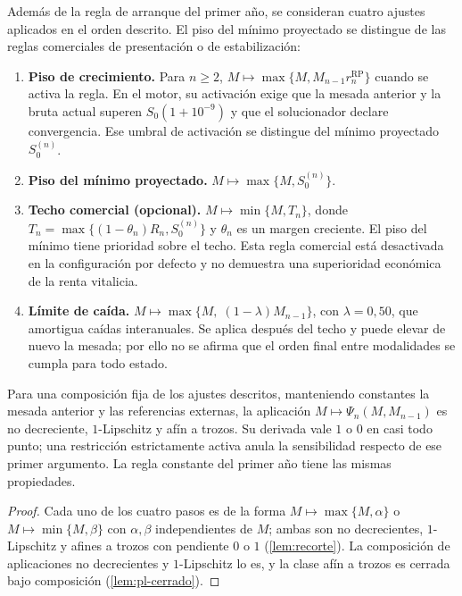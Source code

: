 Además de la regla de arranque del primer año, se consideran cuatro ajustes
aplicados en el orden descrito. El piso del mínimo proyectado se distingue de las reglas
comerciales de presentación o de estabilización:

\begin{enumerate}[leftmargin=*]
  \item \textbf{Piso de crecimiento.}
        Para $n\ge2$, $M\mapsto\max\{M,M_{n-1}r_n^{\mathrm{RP}}\}$ cuando
        se activa la regla. En el motor, su activación exige que la mesada
        anterior y la bruta actual superen $S_0(1+10^{-9})$ y que el
        solucionador declare convergencia. Ese umbral de activación se
        distingue del mínimo proyectado $S_0^{(n)}$.
  \item \textbf{Piso del mínimo proyectado.}
        $M\mapsto\max\{M,S_0^{(n)}\}$.
  \item \textbf{Techo comercial (opcional).}
        $M\mapsto\min\{M,T_n\}$, donde
        $T_n=\max\{(1-\theta_n)R_n,S_0^{(n)}\}$ y $\theta_n$ es un margen
        creciente. El piso del mínimo tiene prioridad sobre el techo. Esta regla
        comercial está desactivada en la configuración por defecto y no
        demuestra una superioridad económica de la renta vitalicia.
  \item \textbf{Límite de caída.} $M\mapsto\max\{M,\;(1-\lambda)M_{n-1}\}$, con
        $\lambda=0{,}50$, que amortigua caídas interanuales. Se aplica después
        del techo y puede elevar de nuevo la mesada; por ello no se afirma
        que el orden final entre modalidades se cumpla para todo estado.
\end{enumerate}

\begin{proposition}
\label{prop:psi}
Para una composición fija de los ajustes descritos, manteniendo constantes
la mesada anterior y las referencias externas, la aplicación
$M\mapsto\Psi_n(M,M_{n-1})$ es no decreciente, $1$-Lipschitz y afín a trozos.
Su derivada vale $1$ o $0$ en casi todo punto; una restricción estrictamente
activa anula la sensibilidad respecto de ese primer argumento. La regla
constante del primer año tiene las mismas propiedades.
\end{proposition}
\begin{proof}
Cada uno de los cuatro pasos es de la forma $M\mapsto\max\{M,\alpha\}$ o
$M\mapsto\min\{M,\beta\}$ con $\alpha,\beta$ independientes de $M$; ambas son no
decrecientes, $1$-Lipschitz y afines a trozos con pendiente $0$ o $1$
(\cref{lem:recorte}). La composición de aplicaciones no decrecientes y
$1$-Lipschitz lo es, y la clase afín a trozos es cerrada bajo composición
(\cref{lem:pl-cerrado}).
\end{proof}

